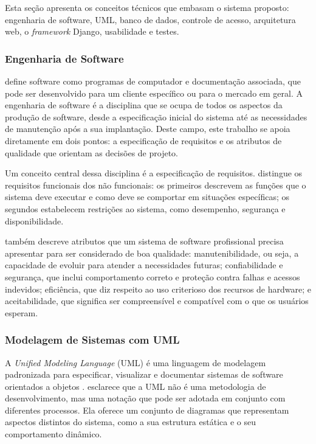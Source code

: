 \documentclass[
	12pt,				%
	twoside,			%
	openany,			%
	a4paper,			%
	chapter=TITLE,		%
	section=TITLE,		%
	subsection=TITLE,	%
	subsubsection=TITLE,%
	english,			%
	french,				%
	spanish,			%
	brazil,				%
	]{abntex2}
\begin{document}
Esta seção apresenta os conceitos técnicos que embasam o sistema proposto: engenharia de software, UML, banco de dados, controle de acesso, arquitetura web, o \textit{framework} Django, usabilidade e testes.

\subsubsection{Engenharia de Software}
\label{sec:engsw}

 define software como programas de computador e documentação associada, que pode ser desenvolvido para um cliente específico ou para o mercado em geral. A engenharia de software é a disciplina que se ocupa de todos os aspectos da produção de software, desde a especificação inicial do sistema até as necessidades de manutenção após a sua implantação. Deste campo, este trabalho se apoia diretamente em dois pontos: a especificação de requisitos e os atributos de qualidade que orientam as decisões de projeto.

Um conceito central dessa disciplina é a especificação de requisitos.  distingue os requisitos funcionais dos não funcionais: os primeiros descrevem as funções que o sistema deve executar e como deve se comportar em situações específicas; os segundos estabelecem restrições ao sistema, como desempenho, segurança e disponibilidade.

 também descreve atributos que um sistema de software profissional precisa apresentar para ser considerado de boa qualidade: manutenibilidade, ou seja, a capacidade de evoluir para atender a necessidades futuras; confiabilidade e segurança, que inclui comportamento correto e proteção contra falhas e acessos indevidos; eficiência, que diz respeito ao uso criterioso dos recursos de hardware; e aceitabilidade, que significa ser compreensível e compatível com o que os usuários esperam.

\subsubsection{Modelagem de Sistemas com UML}
\label{sec:uml}

A \textit{Unified Modeling Language} (UML) é uma linguagem de modelagem padronizada para especificar, visualizar e documentar sistemas de software orientados a objetos \cite{bezerra2007}.  esclarece que a UML não é uma metodologia de desenvolvimento, mas uma notação que pode ser adotada em conjunto com diferentes processos. Ela oferece um conjunto de diagramas que representam aspectos distintos do sistema, como a sua estrutura estática e o seu comportamento dinâmico.
\end{document}
